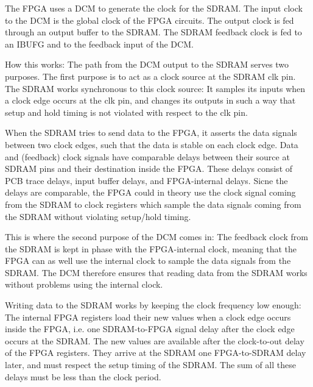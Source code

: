 The FPGA uses a DCM to generate the clock for the SDRAM. The input clock to the DCM is the global clock of the FPGA circuits. The output clock is fed through an output buffer to the SDRAM. The SDRAM feedback clock is fed to an IBUFG and to the feedback input of the DCM.

How this works: The path from the DCM output to the SDRAM serves two purposes. The first purpose is to act as a clock source at the SDRAM clk pin. The SDRAM works synchronous to this clock source: It samples its inputs when a clock edge occurs at the clk pin, and changes its outputs in such a way that setup and hold timing is not violated with respect to the clk pin.

When the SDRAM tries to send data to the FPGA, it asserts the data signals between two clock edges, such that the data is stable on each clock edge. Data and (feedback) clock signals have comparable delays between their source at SDRAM pins and their destination inside the FPGA. These delays consist of PCB trace delays, input buffer delays, and FPGA-internal delays. Sicne the delays are comparable, the FPGA could in theory use the clock signal coming from the SDRAM to clock registers which sample the data signals coming from the SDRAM without violating setup/hold timing.

This is where the second purpose of the DCM comes in: The feedback clock from the SDRAM is kept in phase with the FPGA-internal clock, meaning that the FPGA can as well use the internal clock to sample the data signals from the SDRAM. The DCM therefore ensures that reading data from the SDRAM works without problems using the internal clock.

Writing data to the SDRAM works by keeping the clock frequency low enough: The internal FPGA registers load their new values when a clock edge occurs inside the FPGA, i.e. one SDRAM-to-FPGA signal delay after the clock edge occurs at the SDRAM. The new values are available after the clock-to-out delay of the FPGA registers. They arrive at the SDRAM one FPGA-to-SDRAM delay later, and must respect the setup timing of the SDRAM. The sum of all these delays must be less than the clock period.

